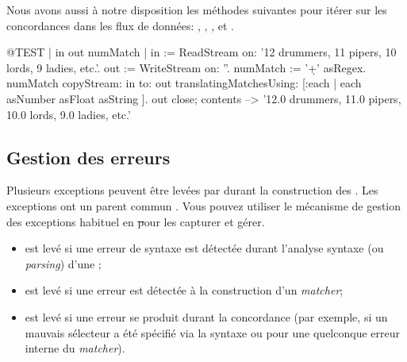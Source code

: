 \documentclass[a4paper,10pt,twoside]{book}
\begin{document}
{Nous avons aussi à notre disposition les méthodes suivantes pour
itérer sur les concordances dans les flux de données:
,
,
,
 et
.

\begin{code}{@TEST | in out numMatch |}
in := ReadStream on: '12 drummers, 11 pipers, 10 lords, 9 ladies, etc.'.
out := WriteStream on: ''.
numMatch := '\<\d+\>' asRegex.
numMatch
  copyStream: in
  to: out
  translatingMatchesUsing: [:each | each asNumber asFloat asString ].
out close; contents --> '12.0 drummers, 11.0 pipers, 10.0 lords, 9.0 ladies, etc.'
\end{code} %


\subsection{Gestion des erreurs}

Plusieurs exceptions peuvent être levées par  durant la
construction des \expregs. Les exceptions ont un parent commun
.
Vous pouvez utiliser le mécanisme de gestion des exceptions habituel
en \st pour les capturer et gérer.

\begin{itemize}
\item {} est levé si une erreur de syntaxe est
  détectée durant l'analyse syntaxe (ou \emph{parsing}) d'une \expreg;
\item {} est levé si une erreur est
  détectée à la construction d'un \emph{matcher};
\item {} est levé si une erreur se produit
  durant la concordance (par exemple, si un mauvais sélecteur a été
  spécifié via la syntaxe  ou pour une quelconque
  erreur interne du \emph{matcher}).



\end{itemize}}
\end{document}
